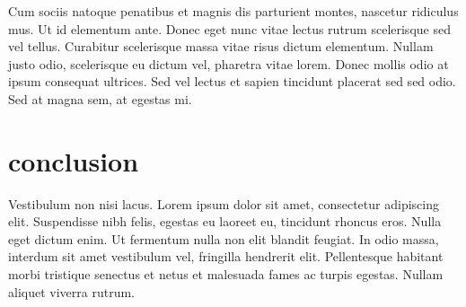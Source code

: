 \documentclass[12pt, oneside, letterpaper]{amsart}
\begin{document}
Cum sociis natoque penatibus et magnis dis parturient montes, nascetur ridiculus mus. Ut id elementum ante. Donec eget nunc vitae lectus rutrum scelerisque sed vel tellus. Curabitur scelerisque massa vitae risus dictum elementum. Nullam justo odio, scelerisque eu dictum vel, pharetra vitae lorem. Donec mollis odio at ipsum consequat ultrices. Sed vel lectus et sapien tincidunt placerat sed sed odio. Sed at magna sem, at egestas mi.

\section{conclusion}

Vestibulum non nisi lacus. Lorem ipsum dolor sit amet, consectetur adipiscing elit. Suspendisse nibh felis, egestas eu laoreet eu, tincidunt rhoncus eros. Nulla eget dictum enim. Ut fermentum nulla non elit blandit feugiat. In odio massa, interdum sit amet vestibulum vel, fringilla hendrerit elit. Pellentesque habitant morbi tristique senectus et netus et malesuada fames ac turpis egestas. Nullam aliquet viverra rutrum.
\end{document}
